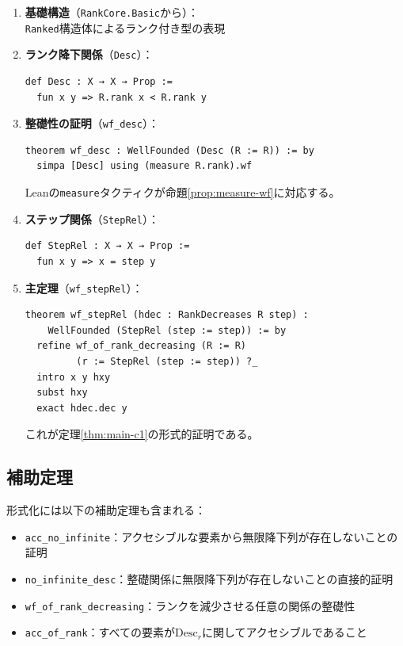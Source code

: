 \documentclass[11pt,a4paper]{ltjsarticle}
\theoremstyle{definition}
\begin{document}
\begin{enumerate}[leftmargin=*]
\item \textbf{基礎構造}（\texttt{RankCore.Basic}から）：\\
      \texttt{Ranked}構造体によるランク付き型の表現

\item \textbf{ランク降下関係}（\texttt{Desc}）：
\begin{verbatim}
def Desc : X → X → Prop :=
  fun x y => R.rank x < R.rank y
\end{verbatim}

\item \textbf{整礎性の証明}（\texttt{wf\_desc}）：
\begin{verbatim}
theorem wf_desc : WellFounded (Desc (R := R)) := by
  simpa [Desc] using (measure R.rank).wf
\end{verbatim}
Leanの\texttt{measure}タクティクが命題\ref{prop:measure-wf}に対応する。

\item \textbf{ステップ関係}（\texttt{StepRel}）：
\begin{verbatim}
def StepRel : X → X → Prop :=
  fun x y => x = step y
\end{verbatim}

\item \textbf{主定理}（\texttt{wf\_stepRel}）：
\begin{verbatim}
theorem wf_stepRel (hdec : RankDecreases R step) :
    WellFounded (StepRel (step := step)) := by
  refine wf_of_rank_decreasing (R := R)
         (r := StepRel (step := step)) ?_
  intro x y hxy
  subst hxy
  exact hdec.dec y
\end{verbatim}
これが定理\ref{thm:main-c1}の形式的証明である。
\end{enumerate}

\subsection{補助定理}

形式化には以下の補助定理も含まれる：

\begin{itemize}[leftmargin=*]
\item \texttt{acc\_no\_infinite}：アクセシブルな要素から無限降下列が存在しないことの証明
\item \texttt{no\_infinite\_desc}：整礎関係に無限降下列が存在しないことの直接的証明
\item \texttt{wf\_of\_rank\_decreasing}：ランクを減少させる任意の関係の整礎性
\item \texttt{acc\_of\_rank}：すべての要素が$\mathrm{Desc}_r$に関してアクセシブルであること
\end{itemize}
\end{document}
